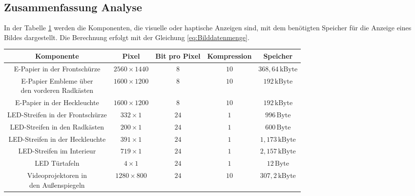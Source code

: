\subsection{Zusammenfassung Analyse} \label{ZusammendassungAnalyse}
In der Tabelle \ref{tab:Speicherbedarf} werden die Komponenten, die visuelle oder haptische Anzeigen sind, mit dem benötigten Speicher für die Anzeige eines Bildes dargestellt. Die Berechnung erfolgt mit der Gleichung \ref{eq:Bilddatenmenge}.
\begin{table}[hbt]	
	\centering
	\renewcommand{\arraystretch}{1.5}	%
	\label{tab:Speicherbedarf}
	\begin{tabular}{c|cccc}
		\textbf{Komponente} & \parbox[t]{0.1\linewidth}{\centering Pixel} & \parbox[t]{0.11\linewidth}{\centering Bit pro Pixel} & \parbox[t]{0.15\linewidth}{\centering Kompression} & \parbox[t]{0.1\linewidth}{\centering Speicher} \\ 
		\hline 
		\hline 
		\parbox[t]{0.3\linewidth}{\centering E-Papier in der Frontschürze} & $ 2560 \times 1440 $ & $ 8 $ & $ 10 $ & $ 368,64\,\mathrm{kByte} $\\ \parbox[t]{0.3\linewidth}{\centering E-Papier Embleme über\\den vorderen Radkästen} & $ 1600 \times 1200 $ & $ 8 $ & $ 10 $ & $ 192\,\mathrm{kByte} $ \\
		\parbox[t]{0.3\linewidth}{\centering E-Papier in der Heckleuchte} & $ 1600 \times 1200 $ & $ 8 $ & $ 10 $ & $ 192\,\mathrm{kByte} $ \\
		\parbox[t]{0.3\linewidth}{\centering LED-Streifen in der Frontschürze} & $ 332 \times 1 $ & $ 24 $ & $ 1 $ & $ 996\,\mathrm{Byte} $ \\
		\parbox[t]{0.3\linewidth}{\centering LED-Streifen in den Radkästen} & $ 200 \times 1 $ & $ 24 $ & $ 1 $ & $ 600\,\mathrm{Byte} $\\ \parbox[t]{0.3\linewidth}{\centering LED-Streifen in der Heckleuchte} & $ 391 \times 1 $ & $ 24 $ & $ 1 $ & $ 1,173\,\mathrm{kByte} $ \\ 
		\parbox[t]{0.3\linewidth}{\centering LED-Streifen im Interieur} & $ 719 \times 1 $ & $ 24 $ & $ 1 $ & $ 2,157\,\mathrm{kByte} $ \\
		\parbox[t]{0.3\linewidth}{\centering LED Türtafeln} & $ 4 \times 1 $ & $ 24 $ & $ 1 $ &  $ 12\,\mathrm{Byte} $ \\
		\parbox[t]{0.3\linewidth}{\centering Videoprojektoren in\\den Außenspiegeln} & $ 1280 \times 800 $ & $ 24 $ & $ 10 $ &   $ 307,2\,\mathrm{kByte} $ \\ 

\end{tabular}
\end{table}
